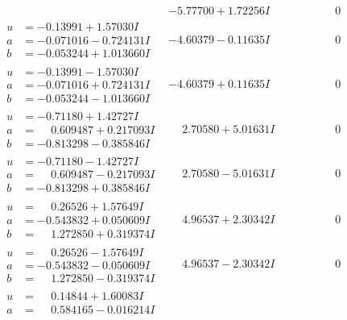 \documentclass[1p]{elsarticle_modified}
\theoremstyle{definition}
\begin{document}
$$\begin{array}{c|c|c}
 & -5.77700 + 1.72256 I & \phantom{-0.000000 } 0 \\ \hline\begin{aligned}
u &= -0.13991 + 1.57030 I \\
a &= -0.071016 - 0.724131 I \\
b &= -0.053244 + 1.013660 I\end{aligned}
 & -4.60379 - 0.11635 I & \phantom{-0.000000 } 0 \\ \hline\begin{aligned}
u &= -0.13991 - 1.57030 I \\
a &= -0.071016 + 0.724131 I \\
b &= -0.053244 - 1.013660 I\end{aligned}
 & -4.60379 + 0.11635 I & \phantom{-0.000000 } 0 \\ \hline\begin{aligned}
u &= -0.71180 + 1.42727 I \\
a &= \phantom{-}0.609487 + 0.217093 I \\
b &= -0.813298 - 0.385846 I\end{aligned}
 & \phantom{-}2.70580 + 5.01631 I & \phantom{-0.000000 } 0 \\ \hline\begin{aligned}
u &= -0.71180 - 1.42727 I \\
a &= \phantom{-}0.609487 - 0.217093 I \\
b &= -0.813298 + 0.385846 I\end{aligned}
 & \phantom{-}2.70580 - 5.01631 I & \phantom{-0.000000 } 0 \\ \hline\begin{aligned}
u &= \phantom{-}0.26526 + 1.57649 I \\
a &= -0.543832 + 0.050609 I \\
b &= \phantom{-}1.272850 + 0.319374 I\end{aligned}
 & \phantom{-}4.96537 + 2.30342 I & \phantom{-0.000000 } 0 \\ \hline\begin{aligned}
u &= \phantom{-}0.26526 - 1.57649 I \\
a &= -0.543832 - 0.050609 I \\
b &= \phantom{-}1.272850 - 0.319374 I\end{aligned}
 & \phantom{-}4.96537 - 2.30342 I & \phantom{-0.000000 } 0 \\ \hline\begin{aligned}
u &= \phantom{-}0.14844 + 1.60083 I \\
a &= \phantom{-}0.584165 - 0.016214 I \\

\end{aligned}
\end{array}$$
\end{document}
